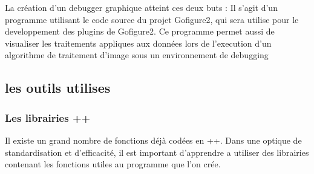 La création d'un debugger graphique atteint ces deux buts : Il s'agit d'un programme utilisant le code source du projet Gofigure2, qui sera utilise pour le developpement des plugins de Gofigure2.
Ce programme permet aussi de visualiser les traitements appliques aux données lors de l'execution d'un algorithme de traitement d'image sous un environnement de debugging

\subsection{les outils utilises}

\subsubsection{Les librairies \C++}

Il existe un grand nombre de fonctions déjà codées en {\C++}. Dans une optique de standardisation et d'efficacité, il est important d'apprendre a utiliser des librairies contenant les fonctions utiles au programme que l'on crée.

